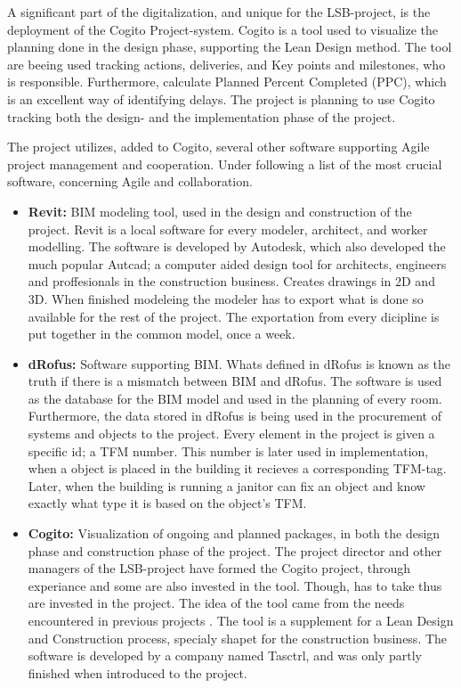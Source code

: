 A significant part of the digitalization, and unique for the LSB-project, is the deployment of the Cogito Project-system. Cogito is a tool used to visualize the planning done in the design phase, supporting the Lean Design method. The tool are beeing used tracking actions, deliveries, and Key points and milestones, who is responsible. Furthermore, calculate Planned Percent Completed (PPC), which is an excellent way of identifying delays. The project is planning to use Cogito tracking both the design- and the implementation phase of the project.

The project utilizes, added to Cogito, several other software supporting Agile project management and cooperation. Under following a list of the most crucial software, concerning Agile and collaboration. 


\begin{itemize}
    \item {\bf Revit:} BIM modeling tool, used in the design and construction of the project. Revit is a local software for every modeler, architect, and worker modelling. The software is developed by Autodesk, which also developed the much popular Autcad; a computer aided design tool for architects, engineers and proffesionals in the construction business. Creates drawings in 2D and 3D. When finished modeleing the modeler has to export what is done so available for the rest of the project. The exportation from every dicipline is put together in the common model, once a week.
    \item {\bf dRofus:} Software supporting BIM. Whats defined in dRofus is known as the truth if there is a mismatch between BIM and dRofus. The software is used as the database for the BIM model and used in the planning of every room. Furthermore, the data stored in dRofus is being used in the procurement of systems and objects to the project. Every element in the project is given a specific id; a TFM number. This number is later used in implementation, when a object is placed in the building it recieves a corresponding TFM-tag. Later, when the building is running a janitor can fix an object and know exactly what type it is based on the object's TFM.
    \item {\bf Cogito:} Visualization of ongoing and planned packages, in both the design phase and construction phase of the project. The project director and other managers of the LSB-project have formed the Cogito project, through experiance and some are also invested in the tool. Though, has to take thus are invested in the project. The idea of the tool came from the needs encountered in previous projects \citep{lean_i_praksis}. The tool is a supplement for a Lean Design and Construction process, specialy shapet for the construction business. The software is developed by a company named Tasctrl, and was only partly finished when introduced to the project. 

\end{itemize}
